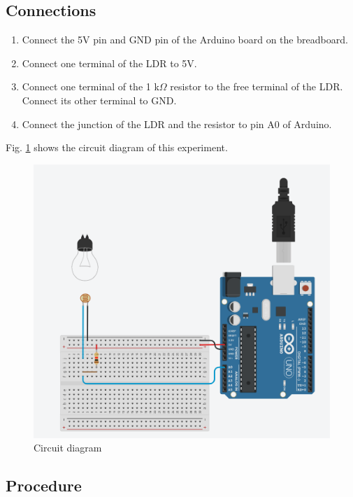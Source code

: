 \subsection*{Connections}
\begin{enumerate}[leftmargin=*]
    \item Connect the 5V pin and GND pin of the Arduino board on the breadboard. 
    \item Connect one terminal of the LDR to 5V. 
    \item Connect one terminal of the 1 k$\Omega$ resistor to the free terminal of the LDR. Connect its other terminal to GND.
    \item Connect the junction of the LDR and the resistor to pin A0 of Arduino.
\end{enumerate}

Fig. \ref{fig:shadows} shows the circuit diagram of this experiment.

\begin{figure}[H]
    \centering
    \includegraphics[scale=0.5]{Figures/shadow.png}
    \caption{Circuit diagram}
    \label{fig:shadows}
\end{figure}

\subsection*{Procedure}


